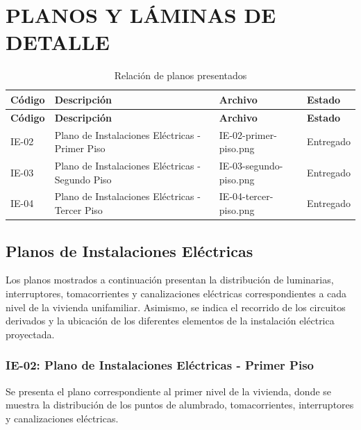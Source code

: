 
\chapter{PLANOS Y LÁMINAS DE DETALLE}

\begin{landscape}
	\begin{longtable}{L{1.6cm}L{5.5cm}L{4.5cm}L{2cm}}
		\caption{Relación de planos presentados}
		\label{tab:planos}\\
		
		\toprule
		\textbf{Código} & \textbf{Descripción} & \textbf{Archivo} & \textbf{Estado} \\
		\midrule
		\endfirsthead
		
		\toprule
		\textbf{Código} & \textbf{Descripción} & \textbf{Archivo} & \textbf{Estado} \\
		\midrule
		\endhead
		
		IE-02 &
		Plano de Instalaciones Eléctricas - Primer Piso &
		IE-02-primer-piso.png &
		Entregado \\
		
		IE-03 &
		Plano de Instalaciones Eléctricas - Segundo Piso &
		IE-03-segundo-piso.png &
		Entregado \\
		
		IE-04 &
		Plano de Instalaciones Eléctricas - Tercer Piso &
		IE-04-tercer-piso.png &
		Entregado \\
		
		\bottomrule
	\end{longtable}
\end{landscape}

\section{Planos de Instalaciones Eléctricas}

Los planos mostrados a continuación presentan la distribución de luminarias, interruptores, tomacorrientes y canalizaciones eléctricas correspondientes a cada nivel de la vivienda unifamiliar. Asimismo, se indica el recorrido de los circuitos derivados y la ubicación de los diferentes elementos de la instalación eléctrica proyectada.

\subsection{IE-02: Plano de Instalaciones Eléctricas - Primer Piso}

Se presenta el plano correspondiente al primer nivel de la vivienda, donde se muestra la distribución de los puntos de alumbrado, tomacorrientes, interruptores y canalizaciones eléctricas.

